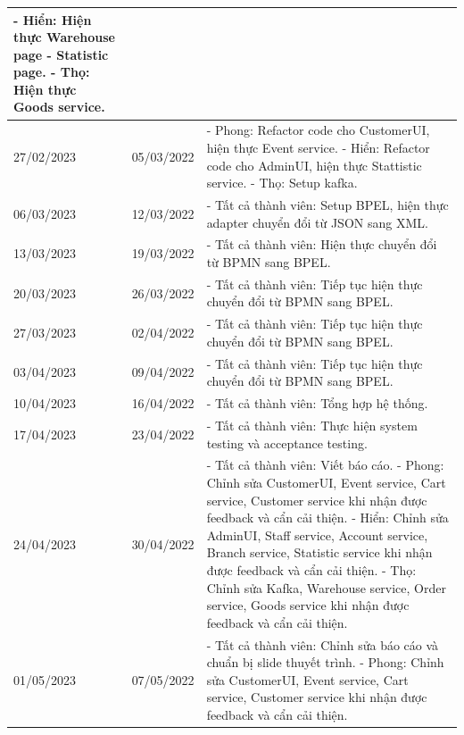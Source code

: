 {\begin{longtable}{| p{2cm} | p{2cm} | p{10cm} |}
    \newline
    - Hiển: Hiện thực Warehouse page - Statistic page. 
    \newline
    - Thọ: Hiện thực Goods service. \\
	\hline
	27/02/2023 & 05/03/2022 & 
    - Phong: Refactor code cho CustomerUI, hiện thực Event service. 
    \newline
    - Hiển: Refactor code cho AdminUI, hiện thực Stattistic service. 
    \newline
    - Thọ: Setup kafka. \\
	\hline
	06/03/2023 & 12/03/2022 & 
    - Tất cả thành viên: Setup BPEL, hiện thực adapter chuyển đổi từ JSON sang XML. \\
	\hline
	13/03/2023 & 19/03/2022 & 
    - Tất cả thành viên: Hiện thực chuyển đổi từ BPMN sang BPEL. \\
	\hline
	20/03/2023 & 26/03/2022 & 
    - Tất cả thành viên: Tiếp tục hiện thực chuyển đổi từ BPMN sang BPEL. \\
	\hline
	27/03/2023 & 02/04/2022 & 
    - Tất cả thành viên: Tiếp tục hiện thực chuyển đổi từ BPMN sang BPEL. \\
	\hline
	03/04/2023 & 09/04/2022 & 
    - Tất cả thành viên: Tiếp tục hiện thực chuyển đổi từ BPMN sang BPEL. \\
	\hline
	10/04/2023 & 16/04/2022 & 
    - Tất cả thành viên: Tổng hợp hệ thống. \\
	\hline
	17/04/2023 & 23/04/2022 & 
    - Tất cả thành viên: Thực hiện system testing và acceptance testing. \\
	\hline
	24/04/2023 & 30/04/2022 & 
    - Tất cả thành viên: Viết báo cáo.
    \newline
    - Phong: Chỉnh sửa CustomerUI, Event service, Cart service, Customer service khi nhận được feedback và cẩn cải thiện. 
    \newline
    - Hiển: Chỉnh sửa AdminUI, Staff service, Account service, Branch service, Statistic service khi nhận được feedback và cẩn cải thiện. 
    \newline
    - Thọ: Chỉnh sửa Kafka, Warehouse service, Order service, Goods service khi nhận được feedback và cẩn cải thiện. \\
	\hline
	01/05/2023 & 07/05/2022 & 
    - Tất cả thành viên: Chỉnh sửa báo cáo và chuẩn bị slide thuyết trình.
    \newline
    - Phong: Chỉnh sửa CustomerUI, Event service, Cart service, Customer service khi nhận được feedback và cẩn cải thiện. 
    \newline

\end{longtable}}
